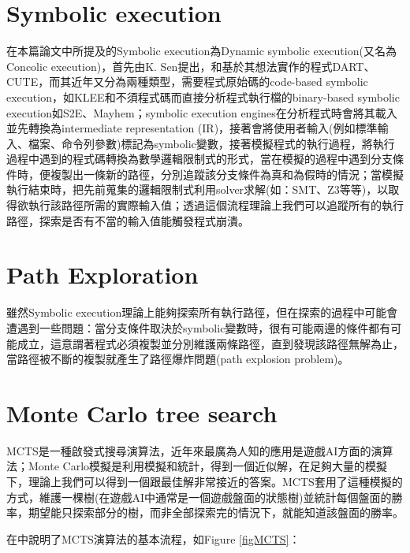 \documentclass[12pt,a4paper,oneside]{book}
\begin{document}
\section{Symbolic execution}

在本篇論文中所提及的Symbolic execution為Dynamic symbolic execution(又名為Concolic execution)，首先由K. Sen\cite{sen2007concolic}提出，和基於其想法實作的程式DART\cite{godefroid2005dart}、CUTE\cite{sen2005cute}，而其近年又分為兩種類型，需要程式原始碼的code-based symbolic execution，如KLEE\cite{cadar2008klee}和不須程式碼而直接分析程式執行檔的binary-based symbolic execution如S2E\cite{chipounov2012s2e}、Mayhem\cite{cha2012mayhem}；symbolic execution engines在分析程式時會將其載入並先轉換為intermediate representation (IR)，接著會將使用者輸入(例如標準輸入、檔案、命令列參數)標記為symbolic變數，接著模擬程式的執行過程，將執行過程中遇到的程式碼轉換為數學邏輯限制式的形式，當在模擬的過程中遇到分支條件時，便複製出一條新的路徑，分別追蹤該分支條件為真和為假時的情況；當模擬執行結束時，把先前蒐集的邏輯限制式利用solver求解(如：SMT\cite{vanegue2012smt}、Z3\cite{Z3}等等)，以取得欲執行該路徑所需的實際輸入值；透過這個流程理論上我們可以追蹤所有的執行路徑，探索是否有不當的輸入值能觸發程式崩潰。

\section{Path Exploration}

雖然Symbolic execution理論上能夠探索所有執行路徑，但在探索的過程中可能會遭遇到一些問題：當分支條件取決於symbolic變數時，很有可能兩邊的條件都有可能成立，這意謂著程式必須複製並分別維護兩條路徑，直到發現該路徑無解為止，當路徑被不斷的複製就產生了路徑爆炸問題(path explosion problem)。

\section{Monte Carlo tree search}

MCTS是一種啟發式搜尋演算法，近年來最廣為人知的應用是遊戲AI方面的演算法；Monte Carlo模擬是利用模擬和統計，得到一個近似解，在足夠大量的模擬下，理論上我們可以得到一個跟最佳解非常接近的答案。MCTS套用了這種模擬的方式，維護一棵樹(在遊戲AI中通常是一個遊戲盤面的狀態樹)並統計每個盤面的勝率，期望能只探索部分的樹，而非全部探索完的情況下，就能知道該盤面的勝率。

在\cite{browne2012surveyMCTS}中說明了MCTS演算法的基本流程，如Figure \ref{figMCTS}：
\end{document}
